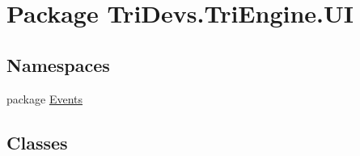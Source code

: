 \hypertarget{namespace_tri_devs_1_1_tri_engine_1_1_u_i}{\section{Package Tri\-Devs.\-Tri\-Engine.\-U\-I}
\label{namespace_tri_devs_1_1_tri_engine_1_1_u_i}
}
\subsection*{Namespaces}
\begin{DoxyCompactItemize}
\item 
package \hyperlink{namespace_tri_devs_1_1_tri_engine_1_1_u_i_1_1_events}{Events}
\end{DoxyCompactItemize}
\subsection*{Classes}
